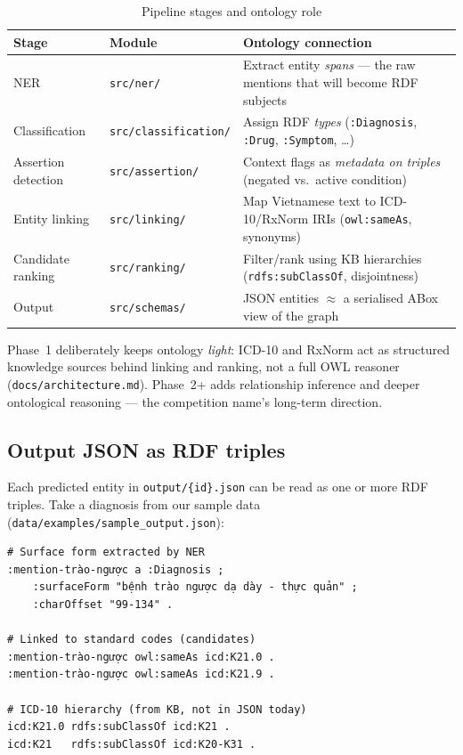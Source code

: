 \begin{table}[htbp]
  \centering
  \small
  \caption{Pipeline stages and ontology role}
  \label{tab:pipeline-ontology}
  \renewcommand{\arraystretch}{1.2}
  \begin{tabularx}{\textwidth}{@{}l l X@{}}
    \toprule
    \textbf{Stage} & \textbf{Module} & \textbf{Ontology connection} \\
    \midrule
    NER & \texttt{src/ner/} &
    Extract entity \emph{spans} --- the raw mentions that will become RDF subjects \\
    Classification & \texttt{src/classification/} &
    Assign RDF \emph{types} (\texttt{:Diagnosis}, \texttt{:Drug}, \texttt{:Symptom}, \ldots) \\
    Assertion detection & \texttt{src/assertion/} &
    Context flags as \emph{metadata on triples} (negated vs.\ active condition) \\
    Entity linking & \texttt{src/linking/} &
    Map Vietnamese text to ICD-10/RxNorm IRIs (\texttt{owl:sameAs}, synonyms) \\
    Candidate ranking & \texttt{src/ranking/} &
    Filter/rank using KB hierarchies (\texttt{rdfs:subClassOf}, disjointness) \\
    Output & \texttt{src/schemas/} &
    JSON entities $\approx$ a serialised ABox view of the graph \\
    \bottomrule
  \end{tabularx}
\end{table}

Phase~1 deliberately keeps ontology \emph{light}: ICD-10 and RxNorm act as structured
knowledge sources behind linking and ranking, not a full OWL reasoner
(\texttt{docs/architecture.md}). Phase~2+ adds relationship inference and deeper
ontological reasoning --- the competition name's long-term direction.

\newpage
\subsection{Output JSON as RDF triples}

Each predicted entity in \texttt{output/\{id\}.json} can be read as one or more
RDF triples. Take a diagnosis from our sample data
(\texttt{data/examples/sample\_output.json}):

\begin{verbatim}
# Surface form extracted by NER
:mention-trào-ngược a :Diagnosis ;
    :surfaceForm "bệnh trào ngược dạ dày - thực quản" ;
    :charOffset "99-134" .

# Linked to standard codes (candidates)
:mention-trào-ngược owl:sameAs icd:K21.0 .
:mention-trào-ngược owl:sameAs icd:K21.9 .

# ICD-10 hierarchy (from KB, not in JSON today)
icd:K21.0 rdfs:subClassOf icd:K21 .
icd:K21   rdfs:subClassOf icd:K20-K31 .
\end{verbatim}

